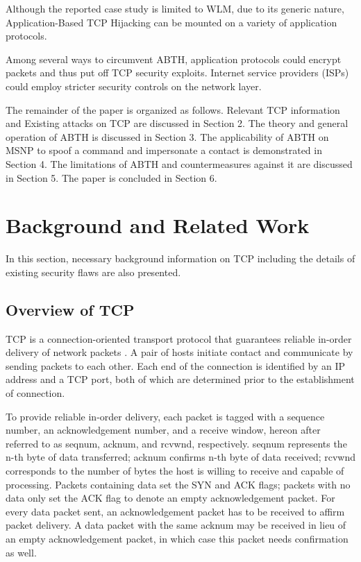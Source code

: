 \documentclass{sig-alternate}
\begin{document}
Although the reported case study is limited to WLM, due to its generic nature, Application-Based TCP Hijacking can be mounted on a variety of application protocols.

Among several ways to circumvent ABTH, application protocols could encrypt packets and thus put off TCP security exploits.
Internet service providers (ISPs) could employ stricter security controls on the network layer.

The remainder of the paper is organized as follows.
Relevant TCP information and Existing attacks on TCP are discussed in Section 2.
The theory and general operation of ABTH is discussed in Section 3.
The applicability of ABTH on MSNP to spoof a command and impersonate a contact is demonstrated in Section 4.
The limitations of ABTH and countermeasures against it are discussed in Section 5.
The paper is concluded in Section 6.

\section{Background and Related Work}

In this section, necessary background information on TCP including the details of existing security flaws are also presented.

\subsection{Overview of TCP}

TCP is a connection-oriented transport protocol that guarantees reliable in-order delivery of network packets \cite{rfc:tcp}.
A pair of hosts initiate contact and communicate by sending packets to each other.
Each end of the connection is identified by an IP address and a TCP port, both of which are determined prior to the establishment of connection.

To provide reliable in-order delivery, each packet is tagged with a sequence number, an acknowledgement number, and a receive window, hereon after referred to as seqnum, acknum, and rcvwnd, respectively.
seqnum represents the n-th byte of data transferred; acknum confirms n-th byte of data received; rcvwnd corresponds to the number of bytes the host is willing to receive and capable of processing.
Packets containing data set the SYN and ACK flags; packets with no data only set the ACK flag to denote an empty acknowledgement packet.
For every data packet sent, an acknowledgement packet has to be received to affirm packet delivery.
A data packet with the same acknum may be received in lieu of an empty acknowledgement packet, in which case this packet needs confirmation as well.
\end{document}
